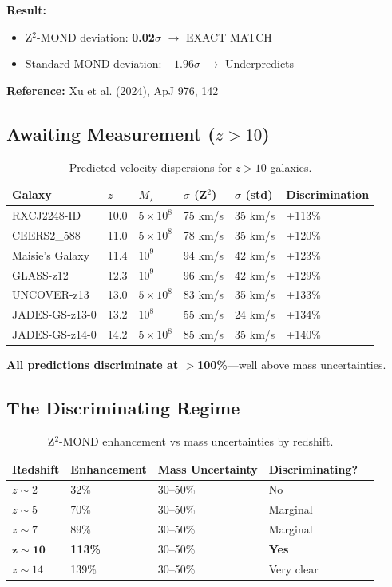 \documentclass[12pt,a4paper]{article}
\begin{document}
\textbf{Result:}
\begin{itemize}
\item Z$^2$-MOND deviation: \textbf{0.02$\sigma$} $\rightarrow$ EXACT MATCH
\item Standard MOND deviation: $-1.96\sigma$ $\rightarrow$ Underpredicts
\end{itemize}

\textbf{Reference:} Xu et al. (2024), ApJ 976, 142

\subsection{Awaiting Measurement ($z > 10$)}

\begin{table}[h]
\centering
\begin{tabular}{@{}llllll@{}}
\toprule
Galaxy & $z$ & $M_\star$ & $\sigma$ (Z$^2$) & $\sigma$ (std) & Discrimination \\
\midrule
RXCJ2248-ID & 10.0 & $5\times 10^8$ & 75 km/s & 35 km/s & +113\% \\
CEERS2\_588 & 11.0 & $5\times 10^8$ & 78 km/s & 35 km/s & +120\% \\
Maisie's Galaxy & 11.4 & $10^9$ & 94 km/s & 42 km/s & +123\% \\
GLASS-z12 & 12.3 & $10^9$ & 96 km/s & 42 km/s & +129\% \\
UNCOVER-z13 & 13.0 & $5\times 10^8$ & 83 km/s & 35 km/s & +133\% \\
JADES-GS-z13-0 & 13.2 & $10^8$ & 55 km/s & 24 km/s & +134\% \\
JADES-GS-z14-0 & 14.2 & $5\times 10^8$ & 85 km/s & 35 km/s & +140\% \\
\bottomrule
\end{tabular}
\caption{Predicted velocity dispersions for $z > 10$ galaxies.}
\end{table}

\textbf{All predictions discriminate at $>$100\%}---well above mass uncertainties.

\subsection{The Discriminating Regime}

\begin{table}[h]
\centering
\begin{tabular}{@{}lllll@{}}
\toprule
Redshift & Enhancement & Mass Uncertainty & Discriminating? \\
\midrule
$z \sim 2$ & 32\% & 30--50\% & No \\
$z \sim 5$ & 70\% & 30--50\% & Marginal \\
$z \sim 7$ & 89\% & 30--50\% & Marginal \\
$\mathbf{z \sim 10}$ & \textbf{113\%} & 30--50\% & \textbf{Yes} \\
$z \sim 14$ & 139\% & 30--50\% & Very clear \\
\bottomrule
\end{tabular}
\caption{Z$^2$-MOND enhancement vs mass uncertainties by redshift.}
\end{table}
\end{document}
